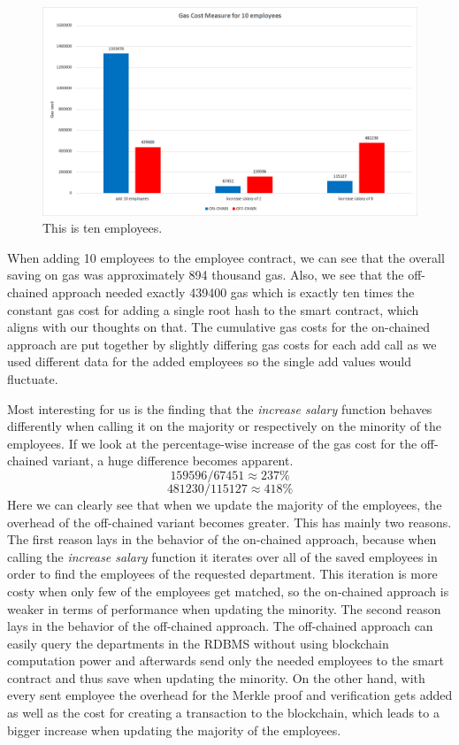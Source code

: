 \begin{figure}[t]
	\centering
	\includegraphics[width=1.0\textwidth]{images/05_evaluation/05_gas_cost_ten.png}
	\caption{\label{fig:05_gas_cost_ten}This is ten employees.}
\end{figure}

When adding 10 employees to the employee contract, we can see that the overall saving on gas was approximately 894 thousand gas.
Also, we see that the off-chained approach needed exactly 439400 gas which is exactly ten times the constant gas cost for adding a single root hash to the smart contract, which aligns with our thoughts on that.
The cumulative gas costs for the on-chained approach are put together by slightly differing gas costs for each add call as we used different data for the added employees so the single add values would fluctuate.

Most interesting for us is the finding that the \textit{increase salary} function behaves differently when calling it on the majority or respectively on the minority of the employees.
If we look at the percentage-wise increase of the gas cost for the off-chained variant, a huge difference becomes apparent.
$$ 159596 / 67451 \approx 237\% $$
$$ 481230 / 115127 \approx 418\% $$
Here we can clearly see that when we update the majority of the employees, the overhead of the off-chained variant becomes greater.
This has mainly two reasons.
The first reason lays in the behavior of the on-chained approach, because when calling the \textit{increase salary} function it iterates over all of the saved employees in order to find the employees of the requested department.
This iteration is more costy when only few of the employees get matched, so the on-chained approach is weaker in terms of performance when updating the minority.
The second reason lays in the behavior of the off-chained approach.
The off-chained approach can easily query the departments in the RDBMS without using blockchain computation power and afterwards send only the needed employees to the smart contract and thus save when updating the minority.
On the other hand, with every sent employee the overhead for the Merkle proof and verification gets added as well as the cost for creating a transaction to the blockchain, which leads to a bigger increase when updating the majority of the employees.

